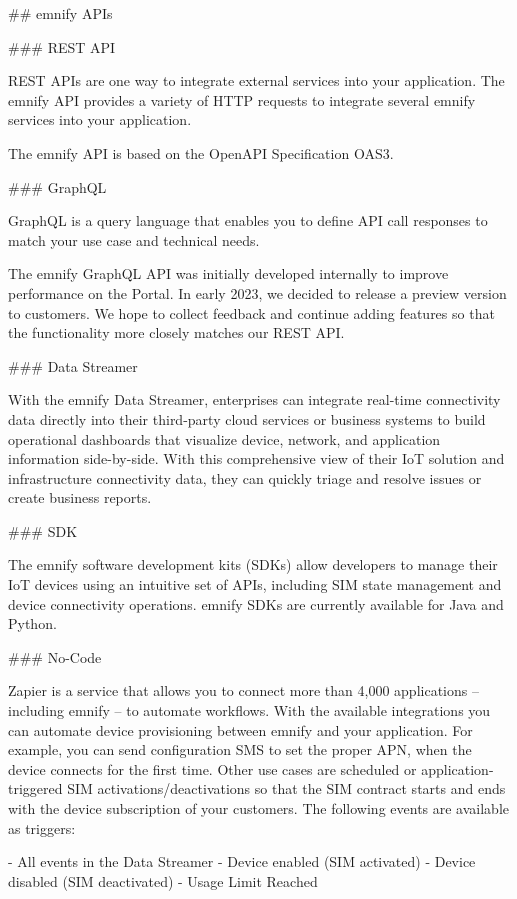 \documentclass[11pt, oneside]{article}   	%
\newcommand{\addspace}{\vspace{2mm}}
\begin{document}
\begin{markdown}
## emnify APIs

### REST API

REST APIs are one way to integrate external services into your application.
The emnify API provides a variety of HTTP requests to integrate several emnify services into your application.

The emnify API is based on the OpenAPI Specification OAS3.

### GraphQL

GraphQL is a query language that enables you to define API call responses to match your use case and technical needs.

The emnify GraphQL API was initially developed internally to improve performance on the Portal.
In early 2023, we decided to release a preview version to customers.
We hope to collect feedback and continue adding features so that the functionality more closely matches our REST API.

### Data Streamer

With the emnify Data Streamer, enterprises can integrate real-time connectivity data directly into their third-party cloud services or business systems to build operational dashboards that visualize device, network, and application information side-by-side.
With this comprehensive view of their IoT solution and infrastructure connectivity data, they can quickly triage and resolve issues or create business reports.

### SDK

The emnify software development kits (SDKs) allow developers to manage their IoT devices using an intuitive set of APIs, including SIM state management and device connectivity operations.
emnify SDKs are currently available for Java and Python.

### No-Code

Zapier is a service that allows you to connect more than 4,000 applications -- including emnify -- to automate workflows.
With the available integrations you can automate device provisioning between emnify and your application.
For example, you can send configuration SMS to set the proper APN, when the device connects for the first time.
Other use cases are scheduled or application-triggered SIM activations/deactivations so that the SIM contract starts and ends with the device subscription of your customers.
The following events are available as triggers:
\end{markdown}
\addspace
\begin{markdown}
- All events in the Data Streamer
- Device enabled (SIM activated)
- Device disabled (SIM deactivated)
- Usage Limit Reached
\end{markdown}
\end{document}
